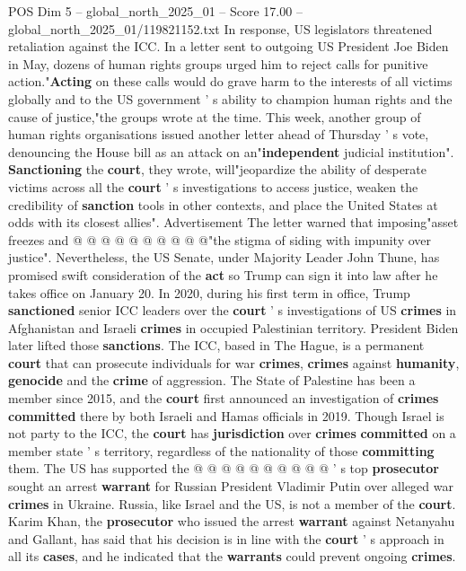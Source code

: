\begin{textsample}{POS Dim 5 – global\_north\_2025\_01 – Score 17.00 – global\_north\_2025\_01/119821152.txt}
In response, US legislators threatened retaliation against the ICC.
In a letter sent to outgoing US President Joe Biden in May, dozens of human rights groups urged him to reject calls for punitive action."\textbf{Acting} on these calls would do grave harm to the interests of all victims globally and to the US government ' s ability to champion human rights and the cause of justice,"the groups wrote at the time.
This week, another group of human rights organisations issued another letter ahead of Thursday ' s vote, denouncing the House bill as an attack on an"\textbf{independent} judicial institution". \textbf{Sanctioning} the \textbf{court}, they wrote, will"jeopardize the ability of desperate victims across all the \textbf{court} ' s investigations to access justice, weaken the credibility of \textbf{sanction} tools in other contexts, and place the United States at odds with its closest allies".
Advertisement The letter warned that imposing"asset freezes and @ @ @ @ @ @ @ @ @ @"the stigma of siding with impunity over justice".
Nevertheless, the US Senate, under Majority Leader John Thune, has promised swift consideration of the \textbf{act} so Trump can sign it into law after he takes office on January 20.
In 2020, during his first term in office, Trump \textbf{sanctioned} senior ICC leaders over the \textbf{court} ' s investigations of US \textbf{crimes} in Afghanistan and Israeli \textbf{crimes} in occupied Palestinian territory.
President Biden later lifted those \textbf{sanctions}.
The ICC, based in The Hague, is a permanent \textbf{court} that can prosecute individuals for war \textbf{crimes}, \textbf{crimes} against \textbf{humanity}, \textbf{genocide} and the \textbf{crime} of aggression.
The State of Palestine has been a member since 2015, and the \textbf{court} first announced an investigation of \textbf{crimes} \textbf{committed} there by both Israeli and Hamas officials in 2019.
Though Israel is not party to the ICC, the \textbf{court} has \textbf{jurisdiction} over \textbf{crimes} \textbf{committed} on a member state ' s territory, regardless of the nationality of those \textbf{committing} them.
The US has supported the @ @ @ @ @ @ @ @ @ @ ' s top \textbf{prosecutor} sought an arrest \textbf{warrant} for Russian President Vladimir Putin over alleged war \textbf{crimes} in Ukraine.
Russia, like Israel and the US, is not a member of the \textbf{court}.
Karim Khan, the \textbf{prosecutor} who issued the arrest \textbf{warrant} against Netanyahu and Gallant, has said that his decision is in line with the \textbf{court} ' s approach in all its \textbf{cases}, and he indicated that the \textbf{warrants} could prevent ongoing \textbf{crimes}.

\end{textsample}
